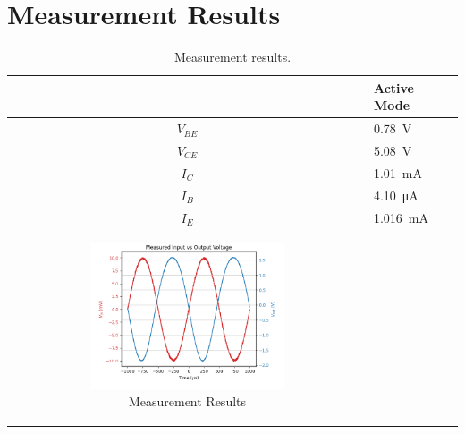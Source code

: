\documentclass{../../ece-report}
\begin{document}
\section*{Measurement Results}

\begin{table}[h!]
  \centering
  \begin{tabular}{c l l}\toprule
      & \textbf{Active Mode} \\
    \midrule
    $V_{BE}$  & 0.78~\si{\V}   \\
    $V_{CE}$  & 5.08~\si{\V}   \\
    $I_C$     & 1.01~\si{\mA} \\
    $I_B$     & 4.10~\si{\uA}   \\
    $I_E$     & 1.016~\si{\mA} \\
\bottomrule

\begin{figure}[h!]
  \centering
  \includegraphics[width=0.7\textwidth]{../plots/png/Measured_AC.png}
  \caption{Measurement Results}
  \label{fig:meas_results}
\end{figure}

\end{tabular}
\caption{Measurement results.}
\label{tab:meas_results}
\end{table}
\end{document}
